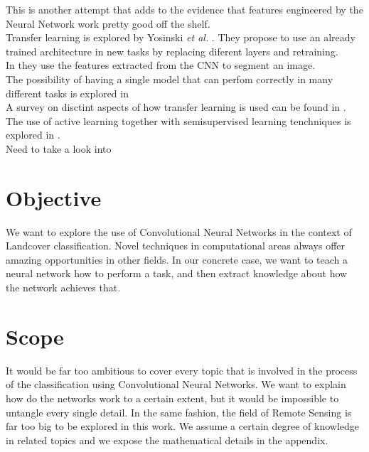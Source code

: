 This is another attempt that adds to the evidence that features engineered by the Neural Network work pretty good off the shelf. \cite{DBLP:journals/corr/RazavianASC14}\\

Transfer learning is explored by Yosinski \textit{et al.} \cite{DBLP:journals/corr/YosinskiCBL14}. They propose to use an already trained architecture in new tasks by replacing diferent layers and retraining.\\

In \cite{DBLP:journals/corr/LongSD14} they use the features extracted from the CNN to segment an image.\\

The possibility of having a single model that can perfom correctly in many different tasks is explored in \cite{DBLP:journals/corr/KaiserGSVPJU17}\\

A survey on disctint aspects of how transfer learning is used can be found in \cite{5288526}.\\

The use of active learning together with semisupervised learning tenchniques is explored in \cite{7956153}.\\

Need to take a look into \cite{DBLP:journals/corr/ChenPKMY14}\\


\section{Objective}

We want to explore the use of Convolutional Neural Networks in the context of Landcover classification. Novel techniques in computational areas always offer amazing opportunities in other fields. In our concrete case, we want to teach a neural network how to perform a task, and then extract knowledge about how the network achieves that.\\

\section{Scope}

It would be far too ambitious to cover every topic that is involved in the process of the classification using Convolutional Neural Networks. We want to explain how do the networks work to a certain extent, but it would be impossible to untangle every single detail. In the same fashion, the field of Remote Sensing is far too big to be explored in this work. We assume a certain degree of knowledge in related topics and we expose the mathematical details in the appendix.\\
